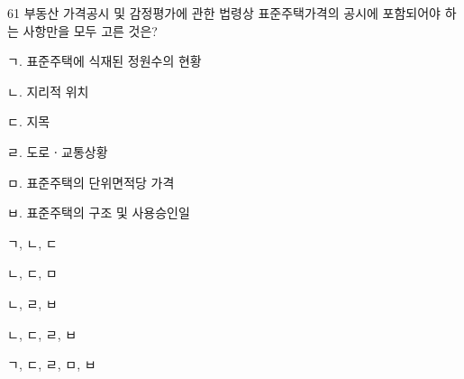 \begin{question}{61}
부동산 가격공시 및 감정평가에 관한 법령상 표준주택가격의 공시에 포함되어야 하는 사항만을 모두 고른 것은?
\begin{framedtext}
ㄱ. 표준주택에 식재된 정원수의 현황 \par
ㄴ. 지리적 위치 \par
ㄷ. 지목 \par
ㄹ. 도로ㆍ교통상황 \par
ㅁ. 표준주택의 단위면적당 가격 \par
ㅂ. 표준주택의 구조 및 사용승인일 \par
\end{framedtext}
\begin{choices}
  \item ㄱ, ㄴ, ㄷ
  \item ㄴ, ㄷ, ㅁ
  \item ㄴ, ㄹ, ㅂ
  \item ㄴ, ㄷ, ㄹ, ㅂ
  \item ㄱ, ㄷ, ㄹ, ㅁ, ㅂ
\end{choices}
\end{question}

